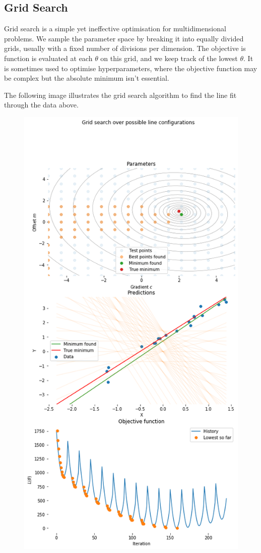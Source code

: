 \documentclass[a4paper, openany]{memoir}
\begin{document}
\subsection{Grid Search}
Grid search is a simple yet ineffective optimisation for multidimensional problems. We sample the parameter space by breaking it into equally divided grids, usually with a fixed number of divisions per dimension. The objective is function is evaluated at each $\theta$ on this grid, and we keep track of the lowest $\theta$. It is sometimes used to optimise hyperparameters, where the objective function may be complex but the absolute minimum isn't essential.

The following image illustrates the grid search algorithm to find the line fit through the data above.
\begin{figure}[H]
    \centering
    \includegraphics[scale=0.5]{src/4.12 grid search line configurations.png}

\end{figure}
\end{document}
